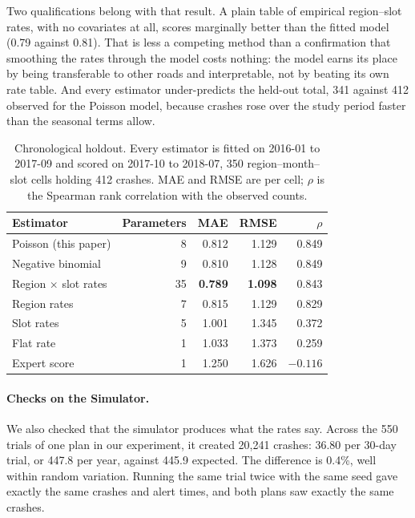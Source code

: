 \documentclass[11pt]{article}
\begin{document}
Two qualifications belong with that result. A plain table of empirical
region--slot rates, with no covariates at all, scores marginally better than
the fitted model (0.79 against 0.81). That is less a competing method than a
confirmation that smoothing the rates through the model costs nothing: the
model earns its place by being transferable to other roads and interpretable,
not by beating its own rate table. And every estimator under-predicts the
held-out total, 341 against 412 observed for the Poisson model, because
crashes rose over the study period faster than the seasonal terms allow.

\begin{table}[htbp]
\centering
\caption{Chronological holdout. Every estimator is fitted on 2016-01 to
2017-09 and scored on 2017-10 to 2018-07, 350 region--month--slot cells
holding 412 crashes. MAE and RMSE are per cell; $\rho$ is the Spearman rank
correlation with the observed counts.}
\label{tab:holdout}
\small
\begin{tabular}{@{}lrrrr@{}}
\toprule
\textbf{Estimator} & \textbf{Parameters} & \textbf{MAE} & \textbf{RMSE} & $\rho$ \\
\midrule
Poisson (this paper)        &  8 & 0.812 & 1.129 & 0.849 \\
Negative binomial           &  9 & 0.810 & 1.128 & 0.849 \\
Region $\times$ slot rates  & 35 & \textbf{0.789} & \textbf{1.098} & 0.843 \\
Region rates                &  7 & 0.815 & 1.129 & 0.829 \\
Slot rates                  &  5 & 1.001 & 1.345 & 0.372 \\
Flat rate                   &  1 & 1.033 & 1.373 & 0.259 \\
Expert score                &  1 & 1.250 & 1.626 & $-0.116$ \\
\bottomrule
\end{tabular}
\end{table}

\paragraph{Checks on the Simulator.}
We also checked that the simulator produces what the rates say. Across the 550
trials of one plan in our experiment, it created 20{,}241 crashes: 36.80 per
30-day trial, or 447.8 per year, against 445.9 expected. The difference is
0.4\%, well within random variation. Running the same trial twice with the same
seed gave exactly the same crashes and alert times, and both plans saw exactly
the same crashes.
\end{document}
